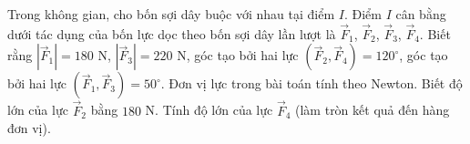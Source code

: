 \begin{ex}
Trong không gian, cho bốn sợi dây buộc với nhau tại điểm $I$. Điểm $I$ cân bằng dưới tác dụng của bốn lực dọc theo bốn sợi dây lần lượt là $\vec F_1$, $\vec F_2$, $\vec F_3$, $\vec F_4$. Biết rằng $|\vec F_1|=180$ N, $|\vec F_3|=220$ N, góc tạo bởi hai lực $\left(\vec F_2,\vec F_4\right)=120^\circ$, góc tạo bởi hai lực $\left(\vec F_1,\vec F_3\right)=50^\circ$. Đơn vị lực trong bài toán tính theo Newton. Biết độ lớn của lực $\vec F_2$ bằng $180$ N. Tính độ lớn của lực $\vec F_4$ (làm tròn kết quả đến hàng đơn vị).
\end{ex}
